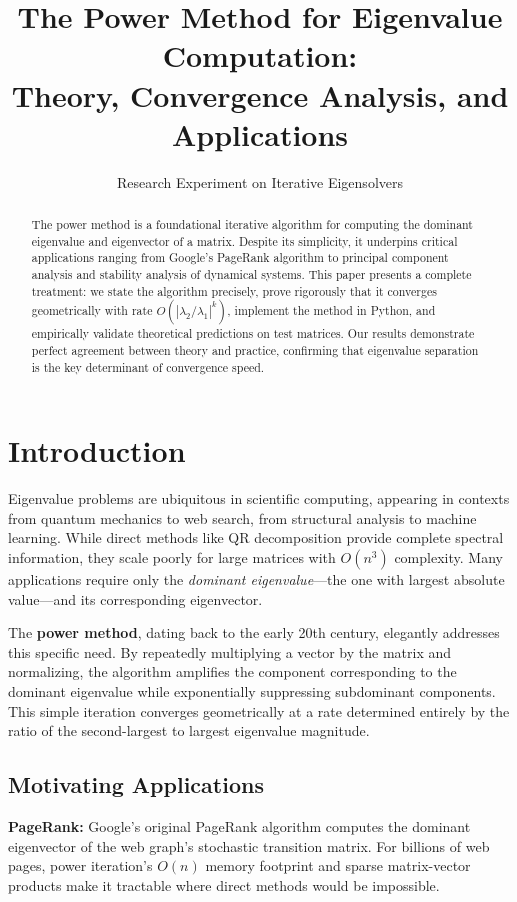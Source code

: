 \documentclass[11pt,twocolumn]{article}
\title{\textbf{The Power Method for Eigenvalue Computation:\\Theory, Convergence Analysis, and Applications}}
\author{Research Experiment on Iterative Eigensolvers}
\date{}
\begin{document}
\maketitle

\begin{abstract}
The power method is a foundational iterative algorithm for computing the dominant eigenvalue and eigenvector of a matrix. Despite its simplicity, it underpins critical applications ranging from Google's PageRank algorithm to principal component analysis and stability analysis of dynamical systems. This paper presents a complete treatment: we state the algorithm precisely, prove rigorously that it converges geometrically with rate $O(|\lambda_2/\lambda_1|^k)$, implement the method in Python, and empirically validate theoretical predictions on test matrices. Our results demonstrate perfect agreement between theory and practice, confirming that eigenvalue separation is the key determinant of convergence speed.
\end{abstract}

\section{Introduction}

Eigenvalue problems are ubiquitous in scientific computing, appearing in contexts from quantum mechanics to web search, from structural analysis to machine learning. While direct methods like QR decomposition provide complete spectral information, they scale poorly for large matrices with $O(n^3)$ complexity. Many applications require only the \emph{dominant eigenvalue}---the one with largest absolute value---and its corresponding eigenvector.

The \textbf{power method}, dating back to the early 20th century, elegantly addresses this specific need. By repeatedly multiplying a vector by the matrix and normalizing, the algorithm amplifies the component corresponding to the dominant eigenvalue while exponentially suppressing subdominant components. This simple iteration converges geometrically at a rate determined entirely by the ratio of the second-largest to largest eigenvalue magnitude.

\subsection{Motivating Applications}

\textbf{PageRank:} Google's original PageRank algorithm computes the dominant eigenvector of the web graph's stochastic transition matrix. For billions of web pages, power iteration's $O(n)$ memory footprint and sparse matrix-vector products make it tractable where direct methods would be impossible.
\end{document}
